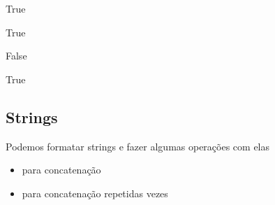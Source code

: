 \documentclass[letterpaper,10pt,english]{jupyterBook}
\begin{document}
\begin{sphinxVerbatim}[commandchars=\\\{\}]
     
\end{sphinxVerbatim}

\begin{sphinxVerbatim}[commandchars=\\\{\}]
True
\end{sphinxVerbatim}

\begin{sphinxVerbatim}[commandchars=\\\{\}]
  \PYG{p}{[}\PYG{p}{]}
  
\end{sphinxVerbatim}

\begin{sphinxVerbatim}[commandchars=\\\{\}]
True
\end{sphinxVerbatim}

\begin{sphinxVerbatim}[commandchars=\\\{\}]
  
\end{sphinxVerbatim}

\begin{sphinxVerbatim}[commandchars=\\\{\}]
False
\end{sphinxVerbatim}

\begin{sphinxVerbatim}[commandchars=\\\{\}]
   
\end{sphinxVerbatim}

\begin{sphinxVerbatim}[commandchars=\\\{\}]
True
\end{sphinxVerbatim}


\subsection{Strings}
\label{\detokenize{chapters/2:id1}}
\sphinxAtStartPar
Podemos formatar strings e fazer algumas operações com elas
\begin{itemize}
\item {} 
\sphinxAtStartPar
\sphinxcode{\sphinxupquote{+}} para concatenação

\item {} 
\sphinxAtStartPar
\sphinxcode{\sphinxupquote{*}} para concatenação repetidas vezes

\end{itemize}
\end{document}
